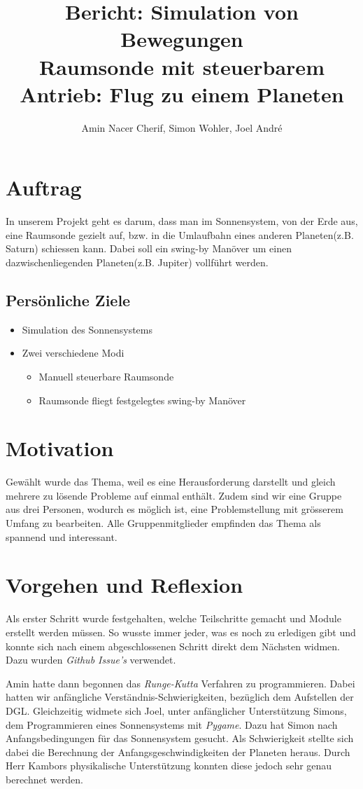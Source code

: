\documentclass{article}
\title{
	Bericht: Simulation von Bewegungen \\
	\large Raumsonde mit steuerbarem Antrieb: Flug zu einem Planeten}
\author{Amin Nacer Cherif, Simon Wohler, Joel André}
\begin{document}
\maketitle

\section{Auftrag}
In unserem Projekt geht es darum, dass man im Sonnensystem, von der Erde aus, eine Raumsonde gezielt auf, bzw. in die Umlaufbahn eines anderen Planeten(z.B. Saturn) schiessen kann. Dabei soll ein swing-by Manöver um einen dazwischenliegenden Planeten(z.B. Jupiter) vollführt werden.

	\subsection{Persönliche Ziele}
		\begin{itemize} 
			\item Simulation des Sonnensystems
			\item Zwei verschiedene Modi
			\begin{itemize} 
				\item Manuell steuerbare Raumsonde
				\item Raumsonde fliegt festgelegtes swing-by Manöver
			\end{itemize}
		\end{itemize}

\section{Motivation}
Gewählt wurde das Thema, weil es eine Herausforderung darstellt und gleich mehrere zu lösende Probleme auf einmal enthält. Zudem sind wir eine Gruppe aus drei Personen, wodurch es möglich ist, eine Problemstellung mit grösserem Umfang zu bearbeiten. Alle Gruppenmitglieder empfinden das Thema als spannend und interessant.

\section{Vorgehen und Reflexion}
Als erster Schritt wurde festgehalten, welche Teilschritte gemacht und Module erstellt werden müssen. So wusste immer jeder, was es noch zu erledigen gibt und konnte sich nach einem abgeschlossenen Schritt direkt dem Nächsten widmen. 
Dazu wurden \textit{Github Issue's} verwendet. 

Amin hatte dann begonnen das \textit{Runge-Kutta} Verfahren zu programmieren. Dabei hatten wir anfängliche Verständnis-Schwierigkeiten, bezüglich dem Aufstellen der DGL.
Gleichzeitig widmete sich Joel, unter anfänglicher Unterstützung Simons, dem Programmieren eines Sonnensystems mit \textit{Pygame}. Dazu hat Simon nach Anfangsbedingungen für das Sonnensystem gesucht. Als Schwierigkeit stellte sich dabei die Berechnung der Anfangsgeschwindigkeiten der Planeten heraus. Durch Herr Kambors physikalische Unterstützung konnten diese jedoch sehr genau berechnet werden. 
\end{document}
